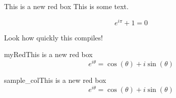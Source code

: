 \begin{redbox}{This is a new red box}
    This is some text.

    \begin{equation*}
        e^{i\pi} + 1 = 0
    \end{equation*}
\end{redbox}

\begin{figure*}
    \begin{center}
    \end{center}
    \caption{
        A cool graph that shows many cool things. This graph is so cool that you
        could probably obtain liquid helium from it.
    }
    \label{fig:gigascaling}
\end{figure*}

Look how quickly this compiles!

\begin{coloredbox}{myRed}{This is a new red box}
    \begin{equation*}
        e^{i\theta} = \cos(\theta) + i\sin(\theta)
    \end{equation*}
\end{coloredbox}

\begin{coloredbox}{sample_col}{This is a new red box}
    \begin{equation*}
        e^{i\theta} = \cos(\theta) + i\sin(\theta)
    \end{equation*}
\end{coloredbox}
